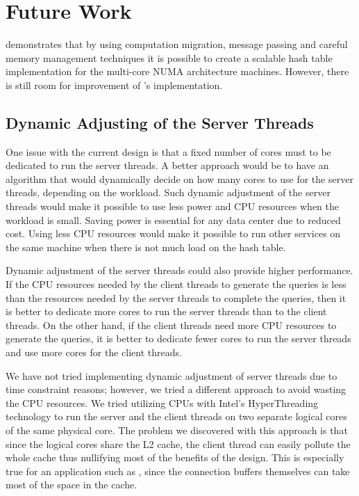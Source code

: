 \chapter{Future Work}
\label{chap:futurework}

\cphash{} demonstrates that by using computation migration, message passing and careful memory management techniques it is
possible to create a scalable hash table implementation for the multi-core NUMA architecture machines. However, there is still
room for improvement of \cphash{}'s implementation. 

\section{Dynamic Adjusting of the Server Threads}

One issue with the current design is that a fixed number of cores must to be dedicated to run the server threads. 
A better approach would be to have an algorithm that would dynamically decide on how many cores to use for the server threads, 
depending on the workload. Such dynamic adjustment of the server threads would make it possible to use less power and CPU resources
when the workload is small. Saving power is essential for any data center due to reduced cost. Using less CPU resources
would make it possible to run other services on the same machine when there is not much load on the hash table. 

Dynamic adjustment of the server threads could also provide higher performance. 
If the CPU resources needed by the client threads to generate the queries is less than the resources needed by the server threads 
to complete the queries, then it is better to dedicate more cores to run the server threads than to the client threads. 
On the other hand, if the client threads need more CPU resources to generate the queries, it is better to dedicate fewer cores to run
the server threads and use more cores for the client threads. 

We have not tried implementing dynamic adjustment of server threads due to time constraint reasons; however, we tried
a different approach to avoid wasting the CPU resources. We tried utilizing CPUs with Intel's HyperThreading technology to run 
the server and the client threads on two separate logical cores of the same physical core. The problem we discovered with this approach is that 
since the logical cores share the L2 cache, the client thread can easily pollute the whole cache thus nullifying most of the benefits of the \cphash{}
design. This is especially true for an application such as \cpserver{}, since the connection buffers themselves can take most of the space in the cache.

